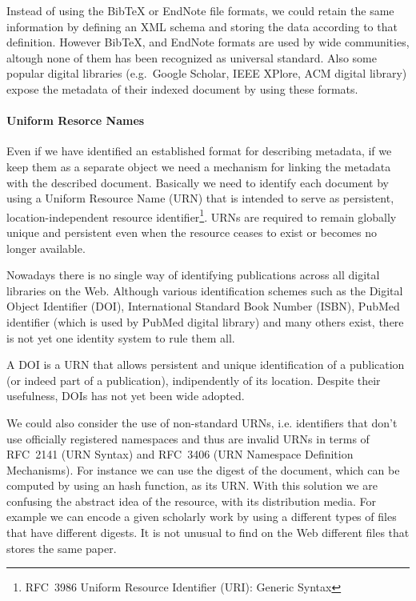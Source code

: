 Instead of using the BibTeX or EndNote file formats, we could retain the same information by defining an XML schema and storing the data according to that definition. However BibTeX, and EndNote formats are used by wide communities, altough none of them has been recognized as universal standard. Also some popular digital libraries (e.g.\ Google Scholar, IEEE XPlore, ACM digital library) expose the metadata of their indexed document by using these formats.

\paragraph{Uniform Resorce Names}\label{sec:urn_issues}
Even if we have identified an established format for describing metadata, if we keep them as a separate object we need a mechanism for linking the metadata with the described document. Basically we need to identify each document by using a Uniform Resource Name (URN) that is intended to serve as persistent, location-independent resource identifier\footnote{RFC~3986 Uniform Resource Identifier (URI): Generic Syntax}. URNs are required to remain globally unique and persistent even when the resource ceases to exist or becomes no longer available.

Nowadays there is no single way of identifying publications across all digital libraries on the Web. Although various identification schemes such as the Digital Object Identifier (DOI), International Standard Book Number (ISBN), PubMed identifier (which is used by PubMed digital library) and many others exist, there is not yet one identity system to rule them all.

A DOI is a URN that allows persistent and unique identification of a publication (or indeed part of a publication), indipendently of its location. Despite their usefulness, DOIs has not yet been wide adopted.

We could also consider the use of non-standard URNs, i.e. identifiers that don't use officially registered namespaces and thus are invalid URNs in terms of RFC~2141 (URN Syntax) and RFC~3406 (URN Namespace Definition Mechanisms). For instance we can use the digest of the document,  which can be computed by using an hash function, as its URN. With this solution we are confusing the abstract idea of the resource, with its distribution media. For example we can encode a given scholarly work by using a different types of files that have different digests. It is not unusual to find on the Web different files that stores the same paper.

